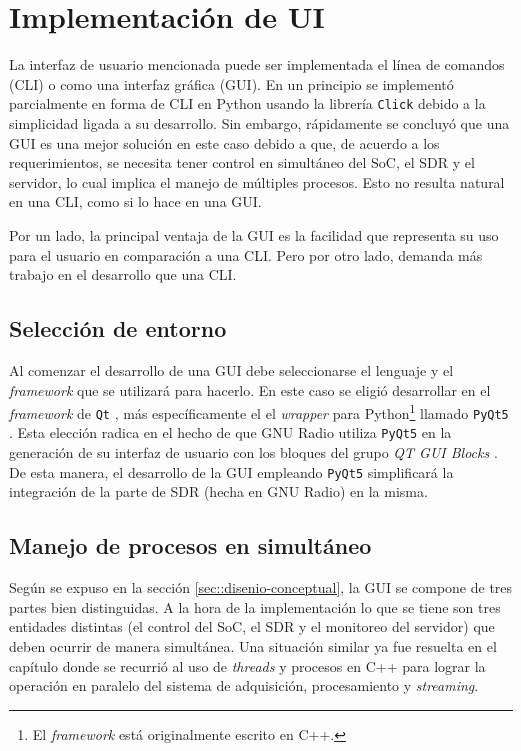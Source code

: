 \documentclass[../../main.tex]{subfiles}
\begin{document}
\section{Implementación de UI}
La interfaz de usuario mencionada puede ser implementada el línea de comandos (CLI) o como una interfaz gráfica (GUI).  En un principio se implementó parcialmente en forma de CLI en Python usando la librería \texttt{Click} \cite{click} debido a la simplicidad ligada a su desarrollo. Sin embargo, rápidamente se concluyó que una GUI es una mejor solución en este caso debido a que, de acuerdo a los requerimientos, se necesita tener control en simultáneo del SoC, el SDR y el servidor, lo cual implica el manejo de múltiples procesos. Esto no resulta natural en una CLI, como si lo hace en una GUI.

Por un lado, la principal ventaja de la GUI es la facilidad que representa su uso para el usuario en comparación a una CLI. Pero por otro lado, demanda más trabajo en el desarrollo que una CLI.

\subsection{Selección de entorno}
Al comenzar el desarrollo de una GUI debe seleccionarse el lenguaje y el \textit{framework} que se utilizará para hacerlo. En este caso se eligió desarrollar en el \textit{framework} de \texttt{Qt} \cite{Qt-framework}, más específicamente el el \textit{wrapper} para Python\footnote{El \textit{framework} está originalmente escrito en C++.} llamado \texttt{PyQt5} \cite{pyqt5}. Esta elección radica en el hecho de que GNU Radio utiliza \texttt{PyQt5} en la generación de su interfaz de usuario con los bloques del grupo \textit{QT GUI Blocks} \cite{gnuradio-qt}. De esta manera, el desarrollo de la GUI empleando \texttt{PyQt5} simplificará la integración de la parte de SDR (hecha en GNU Radio) en la misma.

\subsection{Manejo de procesos en simultáneo}
Según se expuso en la sección \ref{sec::disenio-conceptual}, la GUI se compone de tres partes bien distinguidas. A la hora de la implementación lo que se tiene son tres entidades distintas (el control del SoC, el SDR y el monitoreo del servidor) que deben ocurrir de manera simultánea. Una situación similar ya fue resuelta en el capítulo  donde se recurrió al uso de \textit{threads} y procesos en C++ para lograr la operación en paralelo del sistema de adquisición, procesamiento y \textit{streaming}. 
\end{document}
